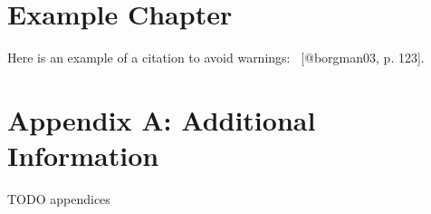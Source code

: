 \documentclass[
  digital,     %
  oneside,     %
  nosansbold,  %
  nocolorbold, %
  lof,         %
  lot,         %
]{fithesis4}
\begin{document}
\chapter{Example Chapter}
\shorthandoff{-}
\begin{markdown}

Here is an example of a citation to avoid warnings: ~[@borgman03, p. 123].

\end{markdown}
\shorthandon{-}

\appendix %
\chapter{Appendix A: Additional Information}
TODO appendices
\end{document}
